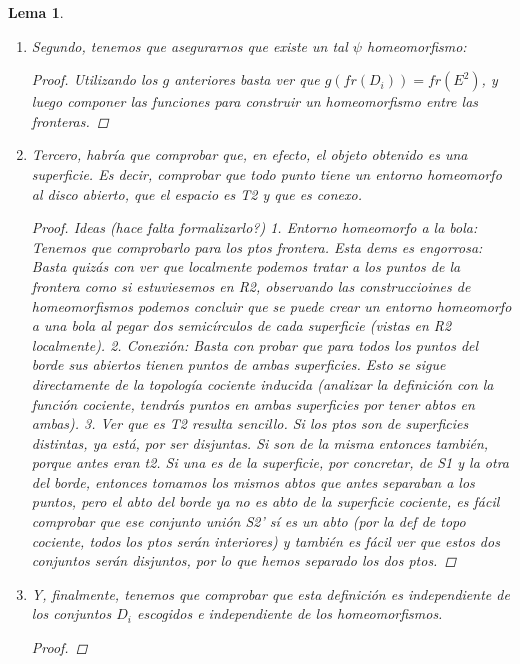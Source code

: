 \documentclass[a4paper,11pt,spanish, twoside, leqno]{tfg-uam}
\newtheorem{lema}[teor]{Lema}
\theoremstyle{definition}
\begin{document}
\begin{lema}
\begin{enumerate}
\begin{proof}
			Tomamos $E_{\frac{1}{2}}$ el disco cerrado de radio $\frac{1}{2}$, y $U'= g^{-1}(E_{\frac{1}{2}})$. Tenemos que $g\mid_{U'}$ es un homeomorfismo de un subconjunto de $S_i$ a $E_{\frac{1}{2}}$ que a su vez es homeomorfo al disco cerrado de radio 1. 
		\end{proof} 
		\item 
		Segundo, tenemos que asegurarnos que existe un tal $\psi$ homeomorfismo:
		\begin{proof}
			Utilizando los $g$ anteriores basta ver que  $g(fr(D_i))=fr(E^2)$, y luego componer las funciones para construir un homeomorfismo entre las fronteras.
		\end{proof}
		\item 
		Tercero, habría que comprobar que, en efecto, el objeto obtenido es una superficie. Es decir, comprobar que todo punto tiene un entorno homeomorfo al disco abierto, que el espacio es T2 y que es conexo.
		\begin{proof}
			Ideas (hace falta formalizarlo?)
			1. Entorno homeomorfo a la bola: Tenemos que comprobarlo para los ptos frontera. Esta dems es engorrosa: Basta quizás con ver que localmente podemos tratar a los puntos de la frontera como si estuviesemos en R2, observando las construccioines de homeomorfismos podemos concluir que se puede crear un entorno homeomorfo a una bola al pegar dos semicírculos de cada superficie (vistas en R2 localmente). 
			2. Conexión: Basta con probar que para todos los puntos del borde  sus abiertos tienen puntos de ambas superficies. Esto se sigue directamente de la topología cociente inducida (analizar la definición con la función cociente, tendrás puntos en ambas superficies por tener abtos en ambas).
			3. Ver que es T2 resulta sencillo. Si los ptos son de superficies distintas, ya está, por ser disjuntas. Si son de la misma entonces también, porque antes eran t2. Si una es de la superficie, por concretar, de S1 y la otra del borde, entonces tomamos los mismos abtos que antes separaban a los puntos, pero el abto del borde ya no es abto de la superficie cociente, es fácil comprobar que ese conjunto unión S2' sí es un abto (por la def de topo cociente, todos los ptos serán interiores) y también es fácil ver que estos dos conjuntos serán disjuntos, por lo que hemos separado los dos ptos.
		\end{proof}
		\item 
		Y, finalmente, tenemos que comprobar que esta definición es independiente de los conjuntos $D_i$ escogidos e independiente de los homeomorfismos.
		\begin{proof}

\end{proof}
\end{enumerate}
\end{lema}
\end{document}
